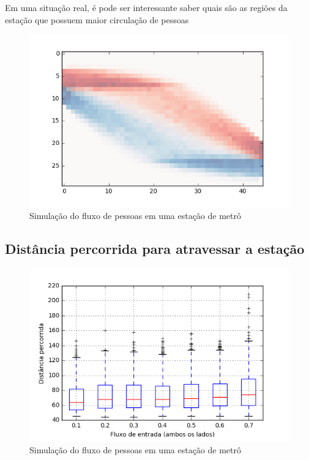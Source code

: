 \documentclass[preprint,12pt]{elsarticle}
\begin{document}
Em uma situação real, é pode ser interessante saber quais são as regiões da estação que possuem maior circulação de pessoas

\begin{figure}[H]
	\centering
	\includegraphics[totalheight=7cm]{figures/heatmap.png}
	\caption{Simulação do fluxo de pessoas em uma estação de metrô}
	\label{fig:heatmap}
\end{figure}

\subsection{Distância percorrida para atravessar a estação}
\label{subsec:tempo_travessia}

\begin{figure}[H]
	\centering
	\includegraphics[totalheight=7cm]{figures/dist_boxplot.png}
	\caption{Simulação do fluxo de pessoas em uma estação de metrô}
	\label{fig:dist_boxplot}
\end{figure}
\end{document}
